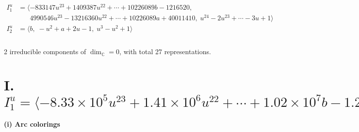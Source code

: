 \documentclass[1p]{elsarticle_modified}
\theoremstyle{definition}
\begin{document}
\begin{align*}
I^u_{1}&=\langle 
-833147 u^{23}+1409387 u^{22}+\cdots+10226089 b-1216520,\\
\phantom{I^u_{1}}&\phantom{= \langle  }4990546 u^{23}-13216360 u^{22}+\cdots+10226089 a+40011410,\;u^{24}-2 u^{23}+\cdots-3 u+1\rangle \\
I^u_{2}&=\langle 
b,\;- u^2+a+2 u-1,\;u^3- u^2+1\rangle \\
\\
\end{align*}
\raggedright * 2 irreducible components of $\dim_{\mathbb{C}}=0$, with total 27 representations.\\
\newpage
\renewcommand{\arraystretch}{1}
\centering \section*{I. $I^u_{1}= \langle -8.33\times10^{5} u^{23}+1.41\times10^{6} u^{22}+\cdots+1.02\times10^{7} b-1.22\times10^{6},\;4.99\times10^{6} u^{23}-1.32\times10^{7} u^{22}+\cdots+1.02\times10^{7} a+4.00\times10^{7},\;u^{24}-2 u^{23}+\cdots-3 u+1 \rangle$}
\flushleft \textbf{(i) Arc colorings}\\
\end{document}
